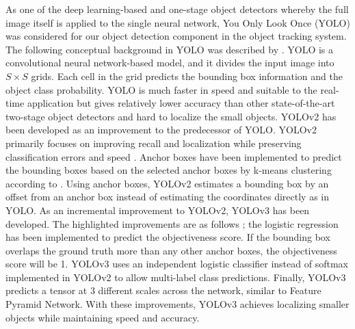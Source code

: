 As one of the deep learning-based and one-stage object detectors whereby the full image itself is applied to the single neural network, You Only Look Once (YOLO) was considered for our object detection component in the object tracking system. The following conceptual background in YOLO was described by \citeauthor{redmon_you_2016} \cite{redmon_you_2016}. YOLO is a convolutional neural network-based model, and it divides the input image into $S \times S$ grids. Each cell in the grid predicts the bounding box information and the object class probability. YOLO is much faster in speed and suitable to the real-time application but gives relatively lower accuracy than other state-of-the-art two-stage object detectors and hard to localize the small objects. YOLOv2 has been developed as an improvement to the predecessor of YOLO. YOLOv2 primarily focuses on improving recall and localization while preserving classification errors and speed \cite{redmon_yolo9000_2017}. Anchor boxes have been implemented to predict the bounding boxes based on the selected anchor boxes by k-means clustering according to \citeauthor{redmon_yolo9000_2017}. Using anchor boxes, YOLOv2 estimates a bounding box by an offset from an anchor box instead of estimating the coordinates directly as in YOLO. As an incremental improvement to YOLOv2, YOLOv3 has been developed. The highlighted improvements are as follows \cite{redmon_yolov3_2018}; the logistic regression has been implemented to predict the objectiveness score. If the bounding box overlaps the ground truth more than any other anchor boxes, the objectiveness score will be 1. YOLOv3 uses an independent logistic classifier instead of softmax implemented in YOLOv2 to allow multi-label class predictions. Finally, YOLOv3 predicts a tensor at 3 different scales across the network, similar to Feature Pyramid Network. With these improvements, YOLOv3 achieves localizing smaller objects while maintaining speed and accuracy.


